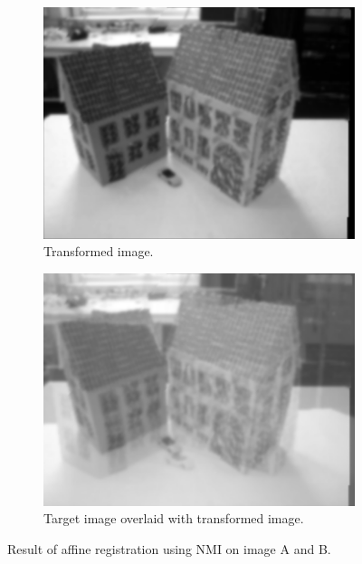 \begin{figure}[h]
	\centering
	\begin{subfigure}{0.4\linewidth}
		\centering
		\includegraphics[width=\linewidth]{Materials/affineNMIAB}
		\caption{Transformed image.\newline}
	\end{subfigure}
	\hspace{1cm}
	\begin{subfigure}{0.4\linewidth}
		\centering
		\includegraphics[width=\linewidth]{Materials/affineNMIABO}
		\caption{Target image overlaid with transformed image.}
	\end{subfigure}
	\caption{Result of affine registration using NMI on image A and B.}
	\label{affineNMIAB}
\end{figure}


